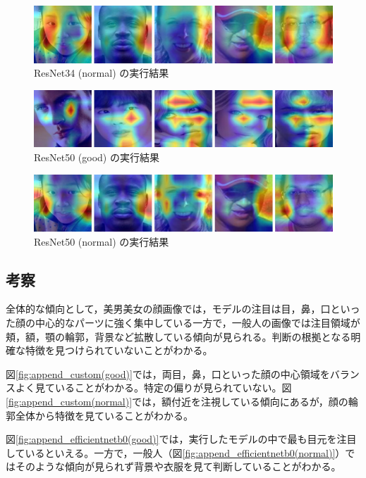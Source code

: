 \documentclass[a4paper,11pt,titlepage]{jsarticle}
\begin{document}
\begin{figure}[H]
    \centering
    \includegraphics[width=1.1\textwidth]{resnet34(normal).jpg}
    \caption{ResNet34 (normal) の実行結果}
    \label{fig:append_resnet34(normal)}
\end{figure}

\begin{figure}[H]
    \centering
    \includegraphics[width=1.1\textwidth]{resnet50(good).jpg}
    \caption{ResNet50 (good) の実行結果}
    \label{fig:append_resnet50(good)}
\end{figure}

\begin{figure}[H]
    \centering
    \includegraphics[width=1.1\textwidth]{resnet50(normal).jpg}
    \caption{ResNet50 (normal) の実行結果}
    \label{fig:append_resnet50(normal)}
\end{figure}


\subsection{考察}
全体的な傾向として，美男美女の顔画像では，モデルの注目は目，鼻，口といった顔の中心的なパーツに強く集中している一方で，一般人の画像では注目領域が頬，額，顎の輪郭，背景など拡散している傾向が見られる。判断の根拠となる明確な特徴を見つけられていないことがわかる。


図\ref{fig:append_custom(good)}では，両目，鼻，口といった顔の中心領域をバランスよく見ていることがわかる。特定の偏りが見られていない。図\ref{fig:append_custom(normal)}では，額付近を注視している傾向にあるが，顔の輪郭全体から特徴を見ていることがわかる。\par
図\ref{fig:append_efficientnetb0(good)}では，実行したモデルの中で最も目元を注目しているといえる。一方で，一般人（図\ref{fig:append_efficientnetb0(normal)}）ではそのような傾向が見られず背景や衣服を見て判断していることがわかる。\par
\end{document}

